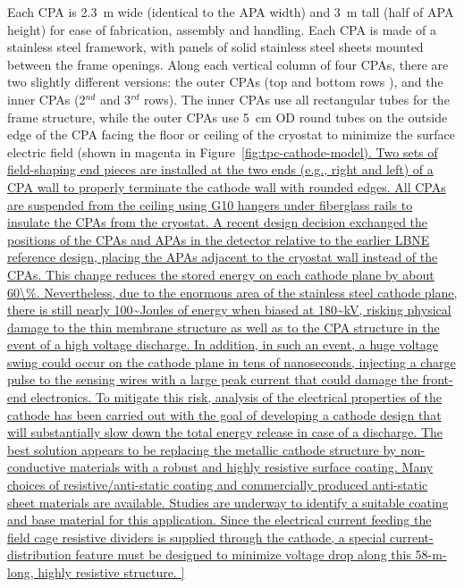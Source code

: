 Each CPA is 2.3~m wide (identical to the APA width) and 3~m tall (half
of APA height) for ease of fabrication, assembly and handling.  Each
CPA is made of a stainless steel framework, with panels of solid
stainless steel sheets mounted between the frame openings.  Along each
vertical column of four CPAs, there are two slightly different
versions: the outer CPAs (top and bottom rows ), and the inner CPAs
(2$^{nd}$ and 3$^{rd}$ rows).  The inner CPAs use all rectangular
tubes for the frame structure, while the outer CPAs use 5~cm OD round
tubes on the outside edge of the CPA facing the floor or ceiling of
the cryostat to minimize the surface electric field (shown in magenta in
  Figure~\ref{fig:tpc-cathode-model).  Two sets of field-shaping
end pieces are installed at the two ends (e.g., right and left) of a
CPA wall to properly terminate the cathode wall with rounded edges.
All CPAs are suspended from the ceiling using G10 hangers under
fiberglass rails to insulate the CPAs from the cryostat.

A recent design decision exchanged the positions of the CPAs and APAs
in the detector relative to the earlier LBNE reference design, placing
the APAs adjacent to the cryostat wall instead of the CPAs.  This
change reduces the stored energy on each cathode plane by about 60\%.
Nevertheless, due to the enormous area of the stainless steel cathode
plane, there is still nearly 100~Joules of energy when biased at
180~kV, risking physical damage to the thin membrane structure as well
as to the CPA structure in the event of a high voltage discharge.  In
addition, in such an event, a huge voltage swing could occur on the
cathode plane in tens of nanoseconds, injecting a charge pulse to the
sensing wires with a large peak current that could damage the
front-end electronics.

To mitigate this risk, analysis of the electrical properties of the
cathode has been carried out with the goal of developing a cathode
design that will substantially slow down the total energy release in
case of a discharge.  The best solution appears to be replacing the
metallic cathode structure by non-conductive materials with a robust
and highly resistive surface coating.  Many choices of 
resistive/anti-static coating and commercially produced
anti-static sheet materials are available.  Studies are underway to identify a
suitable coating and base material for this application.  Since the
electrical current feeding the field cage resistive dividers is
supplied through the cathode, a special current-distribution feature
must be designed to minimize voltage drop along this 58-m-long, highly
resistive structure.


}
